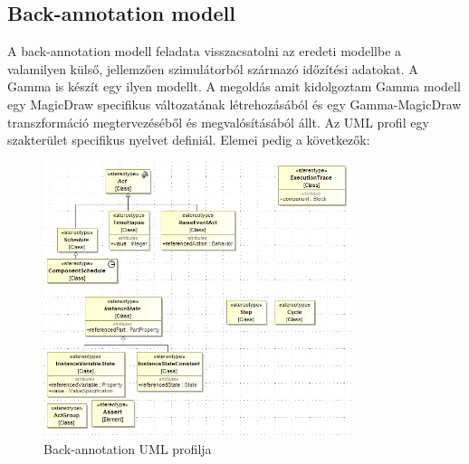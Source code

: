 \subsection{Back-annotation modell}
A back-annotation modell feladata visszacsatolni az eredeti modellbe a valamilyen külső, jellemzően szimulátorból származó időzítési adatokat. A Gamma is készít egy ilyen modellt. A megoldás amit kidolgoztam Gamma modell egy MagicDraw specifikus változatának létrehozásából és egy Gamma-MagicDraw transzformáció megtervezéséből és megvalósításából állt. Az UML profil egy szakterület specifikus nyelvet definiál. Elemei pedig a következők:

\begin{figure}[!ht]
	\centering
	\includegraphics[width=90mm, keepaspectratio]{figures/contribution/trace-model.png}
	\caption{Back-annotation UML profilja}
	\label{fig:contribution-trace-profile}
\end{figure}

